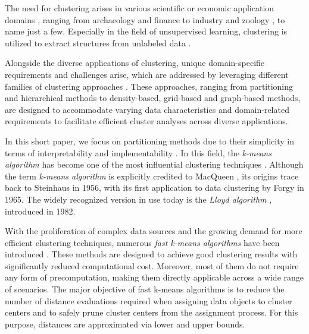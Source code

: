 The need for clustering arises in various scientific or economic application domains \cite{ezugwu2022comprehensive,oyewole2023data, gan2020data}, ranging from archaeology \cite{troiano2024comparative} and finance \cite{cai2016clustering} to industry \cite{lee2021technological} and zoology \cite{shen2021multivariate}, to name just a few. Especially in the field of unsupervised learning, clustering is utilized to extract structures from unlabeled data \cite{chander2023data}.

Alongside the diverse applications of clustering, unique domain-specific requirements and challenges arise, which are addressed by leveraging different families of clustering approaches \cite{xu2015comprehensive,han2012data}. These approaches, ranging from partitioning and hierarchical methods to density-based, grid-based and graph-based methods, are designed to accommodate varying data characteristics and domain-related requirements to facilitate efficient cluster analyses across diverse applications.


In this short paper, we focus on partitioning methods due to their simplicity in terms of interpretability and implementability \cite{DBLP:conf/iiwas/BeecksBHLSD22}. In this field, the \emph{k-means algorithm} \cite{bock2007clustering,hans2008origins,DBLP:journals/prl/Jain10,steinley2006k} has become one of the most influential clustering techniques \cite{DBLP:journals/kais/WuKQGYMMNLYZSHS08,olukanmi2019rethinking}. Although the term \emph{k-means algorithm} is explicitly credited to MacQueen \cite{macqueen1967}, its origins trace back to Steinhaus \cite{steinhaus1956division} in 1956, with its first application to data clustering by Forgy \cite{forgy1965cluster} in 1965. The widely recognized version in use today is the \emph{Lloyd algorithm} \cite{DBLP:journals/tit/Lloyd82}, introduced in 1982.

With the proliferation of complex data sources and the growing demand for more efficient clustering techniques, numerous \emph{fast k-means algorithms} have been introduced \cite{DBLP:conf/icml/Elkan03,DBLP:conf/sdm/Hamerly10,drake2012accelerated,hamerly2015accelerating,DBLP:conf/icml/NewlingF16,DBLP:conf/icml/DingZSMM15,DBLP:conf/sisap/SchubertLF21,DBLP:conf/sisap/LangS23}. These methods are designed to achieve good clustering results with significantly reduced computational cost. Moreover, most of them do not require any form of precomputation, making them directly applicable across a wide range of scenarios. The major objective of fast k-means algorithms is to reduce the number of distance evaluations required when assigning data objects to cluster centers and to safely prune cluster centers from the assignment process. For this purpose, distances are approximated via lower and upper bounds.

